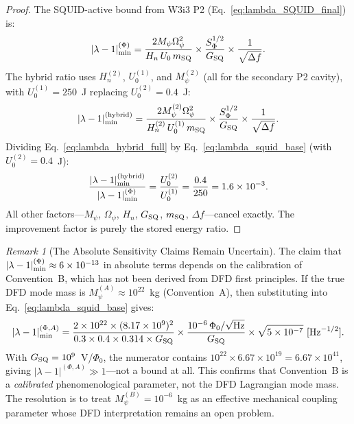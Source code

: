 \documentclass[11pt,twocolumn]{article}
\newcommand{\lam}{\lambda}
\newcommand{\Opsi}{\Omega_\psi}
\newcommand{\Mpsi}{M_\psi}
\newcommand{\ee}[1]{\times 10^{#1}}
\newcommand{\Heff}{H_n}
\newcommand{\Ucav}{U_0}
\theoremstyle{definition}
\theoremstyle{remark}
\newtheorem{remark}[theorem]{Remark}
\begin{document}
\begin{proof}
The SQUID-active bound from W3i3 P2 (Eq.~\eqref{eq:lambda_SQUID_final}) is:
\begin{equation}
|\lam-1|_{\rm min}^{(\Phi)} =
\frac{2\Mpsi\Opsi^2}{\Heff\,\Ucav\,m_{\rm SQ}}
\times\frac{S_\Phi^{1/2}}{G_{\rm SQ}}
\times\frac{1}{\sqrt{\Delta f}}.
\label{eq:lambda_squid_base}
\end{equation}
The hybrid ratio uses $\Heff^{(2)}$, $\Ucav^{(1)}$, and $\Mpsi^{(2)}$
(all for the secondary P2 cavity), with $\Ucav^{(1)} = 250$~J replacing
$\Ucav^{(2)} = 0.4$~J:
\begin{equation}
|\lam-1|_{\rm min}^{(\rm hybrid)}
= \frac{2\Mpsi^{(2)}\Opsi^2}{\Heff^{(2)}\,\Ucav^{(1)}\,m_{\rm SQ}}
\times\frac{S_\Phi^{1/2}}{G_{\rm SQ}}
\times\frac{1}{\sqrt{\Delta f}}.
\label{eq:lambda_hybrid_full}
\end{equation}
Dividing Eq.~\eqref{eq:lambda_hybrid_full} by Eq.~\eqref{eq:lambda_squid_base}
(with $\Ucav^{(2)} = 0.4$~J):
\begin{equation}
\frac{|\lam-1|_{\rm min}^{(\rm hybrid)}}{|\lam-1|_{\rm min}^{(\Phi)}}
= \frac{\Ucav^{(2)}}{\Ucav^{(1)}}
= \frac{0.4}{250} = 1.6\ee{-3}.
\label{eq:ratio_proof}
\end{equation}
All other factors---$\Mpsi$, $\Opsi$, $\Heff$, $G_{\rm SQ}$, $m_{\rm SQ}$,
$\Delta f$---cancel exactly. The improvement factor is purely the stored
energy ratio.
\end{proof}

\begin{remark}[The Absolute Sensitivity Claims Remain Uncertain]
The claim that $|\lam-1|_{\rm min}^{(\Phi)} \approx 6\ee{-13}$ in
absolute terms depends on the calibration of Convention~B, which has
not been derived from DFD first principles. If the true DFD mode mass
is $\Mpsi^{(A)} \approx 10^{22}$~kg (Convention~A), then substituting
into Eq.~\eqref{eq:lambda_squid_base} gives:
\begin{equation}
|\lam-1|_{\rm min}^{(\Phi,A)}
= \frac{2\times10^{22}\times(8.17\ee{9})^2}
{0.3\times0.4\times0.314\times G_{\rm SQ}}
\times\frac{10^{-6}\,\Phi_0/\sqrt{\rm Hz}}{G_{\rm SQ}}
\times\sqrt{5\ee{-7}}~[\text{Hz}^{-1/2}].
\label{eq:lambda_squid_conventionA}
\end{equation}
With $G_{\rm SQ} = 10^9$~V/$\Phi_0$, the numerator contains
$10^{22}\times6.67\ee{19} = 6.67\ee{41}$, giving
$|\lam-1|^{(\Phi,A)} \gg 1$---not a bound at all.
This confirms that Convention~B is a \emph{calibrated} phenomenological
parameter, not the DFD Lagrangian mode mass. The resolution is to treat
$\Mpsi^{(B)} = 10^{-6}$~kg as an effective mechanical coupling parameter
whose DFD interpretation remains an open problem.
\end{remark}
\end{document}
